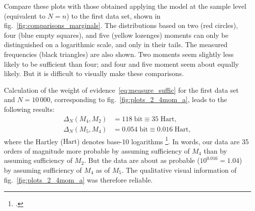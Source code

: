 \documentclass[\ifafour a4paper,12pt,\else a5paper,10pt,\fi%
onecolumn,oneside,article,%
british%
]{memoir}
\theoremstyle{remark}
\theoremstyle{innote}
\newcommand*{\citep}{\footcites}
\renewcommand*{\|}{\nonscript\,\vert\nonscript\;\mathopen{}}
\newcommand*{\sect}{\S}%
\newcommand*{\fig}{fig.}%
\newcommand*{\ydi}{\varDelta}
\newcommand*{\bit}{\textrm{bit}}
\newcommand*{\hart}{\textrm{Hart}}
\begin{document}
Compare these plots with those obtained applying the model at the sample
level (equivalent to $N=n$) to the first data set, shown in
\fig~\ref{fig:comparisons_marginals}. The distributions based on two
(\textcolor{myred}{red circles}), four (\textcolor{myblue}{blue empty
  squares}), and five (\textcolor{myyellow}{yellow lozenges}) moments can
only be distinguished on a logarithmic scale, and only in their tails. The
measured frequencies (black triangles) are also shown. Two moments seem
slightly less likely to be sufficient than four; and four and five moment
seem about equally likely. But it is difficult to visually make these
comparisons.

\medskip

%
%
% 
%
%
Calculation of the weight of evidence~\eqref{eq:measure_suffic} for the
first data set and $N=10\,000$, corresponding to
\fig~\ref{fig:plots_2_4mom_a}, leads to the following results:
\begin{equation}
  \label{eq:diff_suff_N}
  \begin{split}
  \ydi_{N}(M_{4},M_{2}) &= 118\;\bit \equiv 35\;\hart,
\\    \ydi_{N}(M_{5},M_{4}) &= 0.054\;\bit \equiv 0.016\;\hart,
  \end{split}
\end{equation}
where the Hartley ($\hart$) denotes base-10 logarithms
\citep[\sect~C.4]{iso2009}[called \enquote{ban} and used by Turing and Good
in their code-breaking work at Bletchley Park:
see][]{good1985%
}[\sect~4.2]{jaynes1994_r2003}. In words, our data are 35 orders of
magnitude more probable by assuming sufficiency of $M_{4}$ than by assuming
sufficiency of $M_{2}$. But the data are about as probable
($10^{0.016} = 1.04$) by assuming sufficiency of $M_{4}$ as of $M_{5}$. The
qualitative visual information of \fig~\ref{fig:plots_2_4mom_a} was
therefore reliable.
\end{document}
